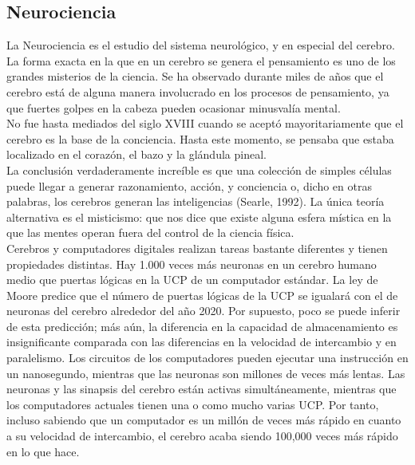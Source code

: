 \documentclass[12pt,a4paper]{report}
\begin{document}
\subsection*{Neurociencia}
La Neurociencia es el estudio del sistema neurológico, y en especial del cerebro. La forma exacta en la que en un cerebro se genera el pensamiento es uno de los grandes misterios de la ciencia. Se ha observado durante miles de años que el cerebro está de alguna manera involucrado en los procesos de pensamiento, ya que fuertes golpes en la cabeza pueden ocasionar minusvalía mental.\\
No fue hasta mediados del siglo XVIII cuando
se aceptó mayoritariamente que el cerebro es la base de la conciencia. Hasta este momento, se pensaba que estaba localizado en el corazón, el bazo y la glándula pineal.\\
La conclusión verdaderamente increíble es que una colección de simples células puede llegar a generar razonamiento, acción, y conciencia o, dicho en otras palabras, los cerebros generan las inteligencias (Searle, 1992). La única teoría alternativa es el misticismo: que nos dice que existe alguna esfera mística en la que las mentes operan fuera del control de la ciencia física.\\
Cerebros y computadores digitales realizan tareas bastante diferentes y tienen propiedades distintas. Hay 1.000 veces más neuronas en un cerebro humano medio que puertas lógicas en la UCP de un computador estándar. La ley de Moore predice que el número de puertas lógicas de la UCP se igualará con el de neuronas del cerebro alrededor del año 2020. Por supuesto, poco se puede inferir de esta predicción; más aún, la diferencia en la capacidad de almacenamiento es insignificante comparada con las diferencias en la velocidad de intercambio y en paralelismo. Los circuitos de los computadores pueden ejecutar una instrucción en un nanosegundo, mientras que las neuronas son millones de veces más lentas. Las neuronas y las sinapsis del cerebro están activas simultáneamente, mientras que los computadores actuales tienen una o como mucho varias UCP. Por tanto, incluso sabiendo que un computador es un millón de veces más rápido en cuanto a su velocidad de intercambio, el cerebro acaba siendo 100,000 veces más rápido en lo que hace.
\end{document}
